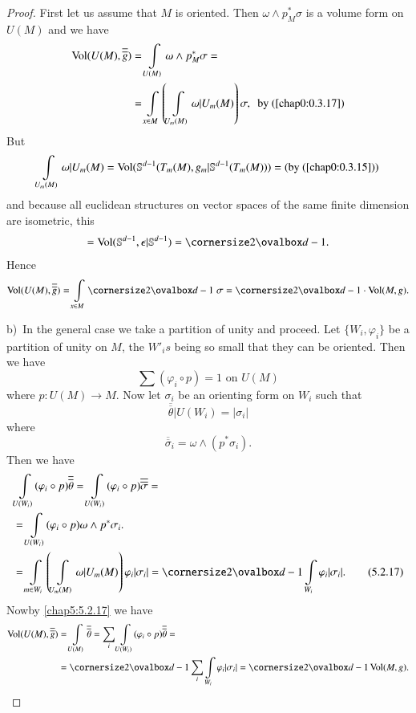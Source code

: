 \begin{proof}
First let us assume that $M$ is oriented. Then $\omega\wedge
p^{\ast}_{M}\sigma$ is a volume form on $U(M)$ and we have
\begin{align*}
\operatorname{Vol}(U(M),\overline{\overline{g}}) &= \int\limits_{U(M)}\omega\wedge
p^{\ast}_{M}\sigma=\\
&=\int\limits_{x\in
  M}\left(\int\limits_{U_{m}(M)}\omega|U_{m}(M)\right)\sigma,\text{
  \ by (\ref{chap0:0.3.17})}
\end{align*}
But\pageoriginale
$$
\int\limits_{U_{m}(M)}\omega|U_{m}(M)=\operatorname{Vol}(\mathbb{S}^{d-1}(T_{m}(M),g_{m}|\mathbb{S}^{d-1}(T_{m}(M)))=\text{(by (\ref{chap0:0.3.15}))}
$$
and because all euclidean structures on vector spaces of the same
finite dimension are isometric, this
$$
=\Vol(\mathbb{S}^{d-1},\epsilon|\mathbb{S}^{d-1})=\oval{d-1}.
$$
Hence
$$
\Vol(U(M),\overline{\overline{g}})=\int\limits_{x\in
  M}\oval{d-1}\; \sigma=\oval{d-1}\cdot \Vol(M,g).
$$

b)~In the general case we take a partition of unity and proceed. Let
$\{W_{i},\varphi_{i}\}$ be a partition of unity on $M$, the $W'_{i}s$
being so small that they can be oriented. Then we have
\begin{equation*}
\sum(\varphi_{i}\circ p)=1\text{ \ on \ } U(M)\tag{5.2.15}\label{chap5:5.2.15}
\end{equation*}
where $p:U(M)\to M$. Now let $\sigma_{i}$ be an orienting form on
$W_{i}$ such that
$$
\overline{\overline{\theta}}|U(W_{i})=|\sigma_{i}|
$$
where
\begin{equation*}
\overline{\overline{\sigma}}_{i}=\omega\wedge(p^{\ast}\sigma_{i}).\tag{5.2.16}\label{chap5:5.2.16} 
\end{equation*}
Then we have
\begin{align*}
& \int\limits_{U(W_{i})}(\varphi_{i}\circ
p)\overline{\overline{\theta}}=\int\limits_{U(W_{i})}(\varphi_{i}\circ
p)\overline{\overline{\sigma}}=\\
&= \int\limits_{U(W_{i})}(\varphi_{i}\circ p)\omega\wedge
p^{\ast}\sigma_{i}.\\
&= \int\limits_{m\in
  W_{i}}\left(\int\limits_{U_{m}(M)}\omega|U_{m}(M)\right)\varphi_{i}|\sigma_{i}|=\oval{d-1}\int\limits_{W_{i}}\varphi_{i}|\sigma_{i}|.\tag{5.2.17}\label{chap5:5.2.17}
\end{align*}
Now\pageoriginale by \eqref{chap5:5.2.17} we have
\begin{align*}
\Vol (U(M),\overline{\overline{g}}) &=
\int\limits_{U(M)}\overline{\overline{\theta}}=\sum_{i}\int\limits_{U(W_{i})}(\varphi_{i}\circ
p)\overline{\overline{\theta}}=\\
&=
\oval{d-1}\sum_{i}\int\limits_{W_{i}}\varphi_{i}|\sigma_{i}|=\oval{d-1}\Vol (M,g).
\end{align*}
\end{proof}

